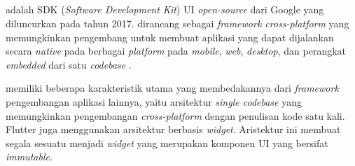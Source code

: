 \subsection{\flutter}
\label{subsec:flutter}

\flutter{} adalah SDK (\emph{Software Development Kit}) UI \emph{open-source} dari Google yang diluncurkan pada tahun 2017. \flutter{} dirancang sebagai \emph{framework cross-platform} yang memungkinkan pengembang untuk membuat aplikasi yang dapat dijalankan secara \emph{native} pada berbagai \emph{platform} pada \emph{mobile}, \emph{web}, \emph{desktop}, dan perangkat \emph{embedded} dari satu \emph{codebase} \parencite{flutter2021}.

\flutter{} memiliki beberapa karakteristik utama yang membedakannya dari \emph{framework} pengembangan aplikasi lainnya, yaitu arsitektur \emph{single codebase} yang memungkinkan pengembangan \emph{cross-platform} dengan penulisan kode satu kali. Flutter juga menggunakan arsitektur berbasis \emph{widget}. Aristektur ini membuat segala sesuatu menjadi \emph{widget} yang merupakan komponen UI yang bersifat \emph{immutable}. 





